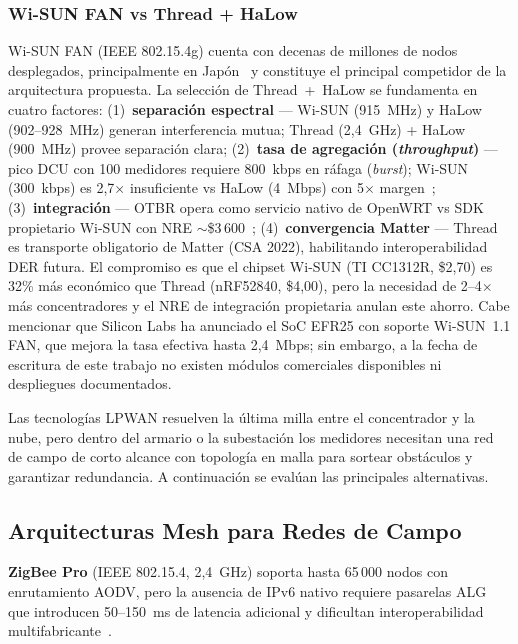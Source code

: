 \subsubsection{Wi-SUN FAN vs Thread + HaLow}
\label{sec:marco-wisun}

Wi-SUN FAN (IEEE 802.15.4g) cuenta con decenas de millones de nodos desplegados, principalmente en Japón~\cite{haradaIEEE802154g2017} y constituye el principal competidor de la arquitectura propuesta. La selección de Thread~+~HaLow se fundamenta en cuatro factores: (1)~\textbf{separación espectral} --- Wi-SUN (915~MHz) y HaLow (902--928~MHz) generan interferencia mutua; Thread (2,4~GHz) + HaLow (900~MHz) provee separación clara; (2)~\textbf{tasa de agregación (\emph{throughput})} --- pico DCU con 100 medidores requiere 800~kbps en ráfaga (\emph{burst}); Wi-SUN (300~kbps) es 2,7$\times$ insuficiente vs HaLow (4~Mbps) con 5$\times$ margen~\cite{zhengPerformancePowerConsumption2018}; (3)~\textbf{integración} --- OTBR opera como servicio nativo de OpenWRT vs SDK propietario Wi-SUN con NRE $\sim$\$3\,600~\cite{openthreadOpenThreadBorderRouter2024}; (4)~\textbf{convergencia Matter} --- Thread es transporte obligatorio de Matter (CSA 2022), habilitando interoperabilidad DER futura. El compromiso es que el chipset Wi-SUN (TI CC1312R, \$2,70) es 32\% más económico que Thread (nRF52840, \$4,00), pero la necesidad de 2--4$\times$ más concentradores y el NRE de integración propietaria anulan este ahorro.  Cabe mencionar que Silicon Labs ha anunciado el SoC EFR25 con soporte Wi-SUN~1.1 FAN, que mejora la tasa efectiva hasta 2,4~Mbps; sin embargo, a la fecha de escritura de este trabajo no existen módulos comerciales disponibles ni despliegues documentados.

Las tecnologías LPWAN resuelven la última milla entre el concentrador y la nube, pero dentro del armario o la subestación los medidores necesitan una red de campo de corto alcance con topología en malla para sortear obstáculos y garantizar redundancia. A continuación se evalúan las principales alternativas.

\subsection{Arquitecturas Mesh para Redes de Campo}
\label{sec:marco-estado-mesh}

\textbf{ZigBee Pro} (IEEE 802.15.4, 2,4~GHz) soporta hasta 65\,000 nodos con enrutamiento AODV, pero la ausencia de IPv6 nativo requiere pasarelas ALG que introducen 50--150~ms de latencia adicional y dificultan interoperabilidad multifabricante~\cite{zigbeealliance2018,abdulsalamOverviewRecentWireless2024}.

